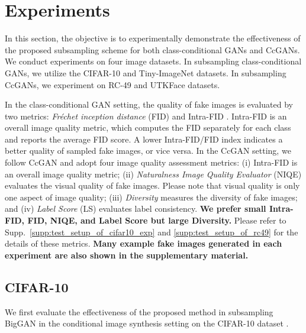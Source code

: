 \documentclass[10pt, twocolumn]{article}
\theoremstyle{definition}
\begin{document}
\vspace{-4mm}
\section{Experiments}\label{sec:experiment}



In this section, the objective is to experimentally demonstrate the effectiveness of the proposed subsampling scheme for both class-conditional GANs and CcGANs. We conduct experiments on four image datasets. In subsampling class-conditional GANs, we utilize the CIFAR-10 \cite{krizhevsky2009learning} and Tiny-ImageNet \cite{Le2015TinyIV} datasets. In subsampling CcGANs, we experiment on  RC-49 \cite{ding2021ccgan, ding2020continuous} and UTKFace \cite{utkface} datasets. 

In the class-conditional GAN setting, the quality of fake images is evaluated by two metrics: \textit{Fr\'echet inception distance} (FID) \cite{heusel2017gans} and Intra-FID \cite{miyato2018cgans}. Intra-FID is an overall image quality metric, which computes the FID separately for each class and reports the average FID score. A lower Intra-FID/FID index indicates a better quality of sampled fake images, or vice versa. In the CcGAN setting, we follow CcGAN \cite{ding2021ccgan} and adopt four image quality assessment metrics: (i) Intra-FID \cite{miyato2018cgans} is an overall image quality metric; (ii) \textit{Naturalness Image Quality Evaluator} (NIQE) \cite{mittal2012making} evaluates the visual quality of fake images. Please note that visual quality is only one aspect of image quality; (iii) \textit{Diversity} measures the diversity of fake images; and (iv) \textit{Label Score} (LS) evaluates label consistency. \textbf{We prefer small Intra-FID, FID, NIQE, and Label Score but large Diversity.} Please refer to Supp.\ \ref{supp:test_setup_of_cifar10_exp} and \ref{supp:test_setup_of_rc49} for the details of these metrics. \textbf{Many example fake images generated in each experiment are also shown in the supplementary material.}



\subsection{CIFAR-10}\label{sec:exp_cifar10}
We first evaluate the effectiveness of the proposed method in subsampling BigGAN \cite{brock2018large} in the conditional image synthesis setting on the CIFAR-10 dataset \cite{krizhevsky2009learning}.  
\end{document}
